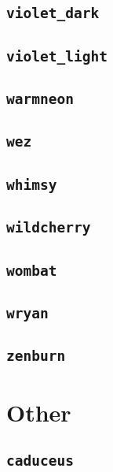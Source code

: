 \subsection{\texttt{violet\_dark}}
\newpage
\subsection{\texttt{violet\_light}}
\newpage
\subsection{\texttt{warmneon}}
\newpage
\subsection{\texttt{wez}}
\newpage
\subsection{\texttt{whimsy}}
\newpage
\subsection{\texttt{wildcherry}}
\newpage
\subsection{\texttt{wombat}}
\newpage
\subsection{\texttt{wryan}}
\newpage
\subsection{\texttt{zenburn}}
\newpage

\section{Other}

\subsection{\texttt{caduceus}}
\newpage


